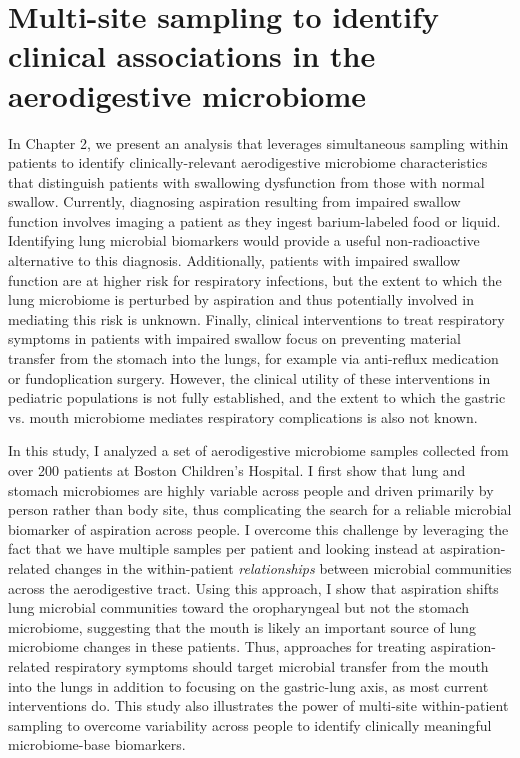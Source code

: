 \section{Multi-site sampling to identify clinical associations in the aerodigestive microbiome}

In Chapter 2, we present an analysis that leverages simultaneous sampling within patients to identify clinically-relevant aerodigestive microbiome characteristics that distinguish patients with swallowing dysfunction from those with normal swallow.
Currently, diagnosing aspiration resulting from impaired swallow function involves imaging a patient as they ingest barium-labeled food or liquid.
Identifying lung microbial biomarkers would provide a useful non-radioactive alternative to this diagnosis.
Additionally, patients with impaired swallow function are at higher risk for respiratory infections, but the extent to which the lung microbiome is perturbed by aspiration and thus potentially involved in mediating this risk is unknown.
Finally, clinical interventions to treat respiratory symptoms in patients with impaired swallow focus on preventing material transfer from the stomach into the lungs, for example via anti-reflux medication or fundoplication surgery.
However, the clinical utility of these interventions in pediatric populations is not fully established, and the extent to which the gastric vs. mouth microbiome mediates respiratory complications is also not known.

In this study, I analyzed a set of aerodigestive microbiome samples collected from over 200 patients at Boston Children's Hospital.
I first show that lung and stomach microbiomes are highly variable across people and driven primarily by person rather than body site, thus complicating the search for a reliable microbial biomarker of aspiration across people.
I overcome this challenge by leveraging the fact that we have multiple samples per patient and looking instead at aspiration-related changes in the within-patient \textit{relationships} between microbial communities across the aerodigestive tract.
Using this approach, I show that aspiration shifts lung microbial communities toward the oropharyngeal but not the stomach microbiome, suggesting that the mouth is likely an important source of lung microbiome changes in these patients.
Thus, approaches for treating aspiration-related respiratory symptoms should target microbial transfer from the mouth into the lungs in addition to focusing on the gastric-lung axis, as most current interventions do.
This study also illustrates the power of multi-site within-patient sampling to overcome variability across people to identify clinically meaningful microbiome-base biomarkers.


